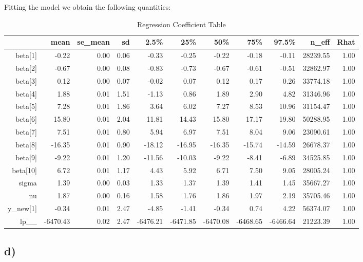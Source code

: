 \documentclass[10pt]{extarticle}
\begin{document}
Fitting the model we obtain the following quantities:
\begin{table}[ht]
	\footnotesize
	\centering
	\begin{tabular}{rrrrrrrrrrr}
		\hline
		& mean & se\_mean & sd & 2.5\% & 25\% & 50\% & 75\% & 97.5\% & n\_eff & Rhat \\ 
		\hline
		beta[1] & -0.22 & 0.00 & 0.06 & -0.33 & -0.25 & -0.22 & -0.18 & -0.11 & 28239.55 & 1.00 \\ 
		beta[2] & -0.67 & 0.00 & 0.08 & -0.83 & -0.73 & -0.67 & -0.61 & -0.51 & 32862.97 & 1.00 \\ 
		beta[3] & 0.12 & 0.00 & 0.07 & -0.02 & 0.07 & 0.12 & 0.17 & 0.26 & 33774.18 & 1.00 \\ 
		beta[4] & 1.88 & 0.01 & 1.51 & -1.13 & 0.86 & 1.89 & 2.90 & 4.82 & 31346.96 & 1.00 \\ 
		beta[5] & 7.28 & 0.01 & 1.86 & 3.64 & 6.02 & 7.27 & 8.53 & 10.96 & 31154.47 & 1.00 \\ 
		beta[6] & 15.80 & 0.01 & 2.04 & 11.81 & 14.43 & 15.80 & 17.17 & 19.80 & 50288.95 & 1.00 \\ 
		beta[7] & 7.51 & 0.01 & 0.80 & 5.94 & 6.97 & 7.51 & 8.04 & 9.06 & 23090.61 & 1.00 \\ 
		beta[8] & -16.35 & 0.01 & 0.90 & -18.12 & -16.95 & -16.35 & -15.74 & -14.59 & 26678.37 & 1.00 \\ 
		beta[9] & -9.22 & 0.01 & 1.20 & -11.56 & -10.03 & -9.22 & -8.41 & -6.89 & 34525.85 & 1.00 \\ 
		beta[10] & 6.72 & 0.01 & 1.17 & 4.43 & 5.92 & 6.71 & 7.50 & 9.05 & 28005.24 & 1.00 \\ 
		sigma & 1.39 & 0.00 & 0.03 & 1.33 & 1.37 & 1.39 & 1.41 & 1.45 & 35667.27 & 1.00 \\ 
		nu & 1.87 & 0.00 & 0.16 & 1.58 & 1.76 & 1.86 & 1.97 & 2.19 & 35705.46 & 1.00 \\ 
		y\_new[1] & -0.34 & 0.01 & 2.47 & -4.85 & -1.41 & -0.34 & 0.74 & 4.22 & 56374.07 & 1.00 \\ 
		lp\_\_ & -6470.43 & 0.02 & 2.47 & -6476.21 & -6471.85 & -6470.08 & -6468.65 & -6466.64 & 21223.39 & 1.00 \\ 
		\hline
	\end{tabular}
\caption{Regression Coefficient Table}
\label{tab:regco}
\end{table}

\subsection*{d)}
\end{document}
